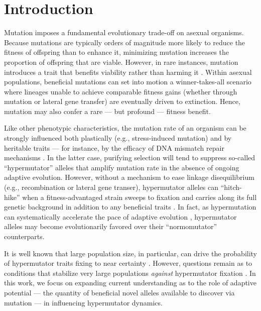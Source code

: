 \section{Introduction} \label{sec:introduction}

Mutation imposes a fundamental evolutionary trade-off on asexual organisms.
Because mutations are typically orders of magnitude more likely to reduce the fitness of offspring than to enhance it, minimizing mutation increases the proportion of offspring that are viable.
However, in rare instances, mutation introduces a trait that benefits viability rather than harming it \citep{zeyl2004capturing,rozen2002fitness} .
Within asexual populations, beneficial mutations can set into motion a winner-takes-all scenario where lineages unable to achieve comparable fitness gains (whether through mutation or lateral gene transfer) are eventually driven to extinction.
Hence, mutation may also confer a rare --- but profound --- fitness benefit.

Like other phenotypic characteristics, the mutation rate of an organism can be strongly influenced both plastically (e.g., stress-induced mutation) \citep{ram2012evolution} and by heritable traits --- for instance, by the efficacy of DNA mismatch repair mechanisms \citep{miller1998mutators}.
In the latter case, purifying selection will tend to suppress so-called ``hypermutator'' alleles that amplify mutation rate in the absence of ongoing adaptive evolution.
However, without a mechanism to ease linkage disequilibrium (e.g., recombination or lateral gene transer), hypermutator alleles can  ``hitch-hike'' when a fitness-advantaged strain sweeps to fixation and carries along its full genetic background in addition to any beneficial traits \citep{smith1974hitchhiking,johnson1999beneficial,gentile2011competition}.
In fact, as hypermutation can systematically accelerate the pace of adaptive evolution \citep{orr2000rate}, hypermutator alleles may become evolutionarily favored over their ``normomutator'' counterparts.

It is well known that large population size, in particular, can drive the probability of hypermutator traits fixing to near certainty \citep{raynes2018sign,tenaillon1999mutators,andre2006evolution,good2016evolution}.
However, questions remain as to conditions that stabilize very large populations \textit{against} hypermutator fixation \citep{raynes2012contrasting,raynes2019migration,tanaka2003evolution}.
In this work, we focus on expanding current understanding as to the role of adaptive potential --- the quantity of beneficial novel alleles available to discover via mutation --- in influencing hypermutator dynamics.

